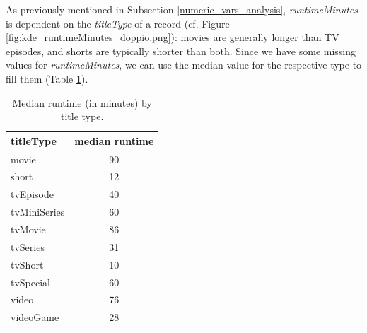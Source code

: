 \begin{table}[h]
    \centering
    \small
    \caption{Top genre for each title type with missing values for \textit{genres}.}
    \label{tab:title_types_top_nan}
\end{table}

As previously mentioned in Subsection \ref{numeric_vars_analysis}, \textit{runtimeMinutes} is dependent on the \textit{titleType} of a record (cf. Figure \ref{fig:kde_runtimeMinutes_doppio.png}): movies are generally longer than TV episodes, and shorts are typically shorter than both. Since we have some missing values for \textit{runtimeMinutes}, we can use the median value for the respective type to fill them (Table \ref{tab:median_runtime}).
\begin{table}[h]
    \centering
    \begin{tabular}{|l|c|}
    \hline
    \textbf{titleType} & \textbf{median runtime} \\ \hline
    movie & 90 \\ \hline
    short & 12 \\ \hline
    tvEpisode & 40 \\ \hline
    tvMiniSeries & 60 \\ \hline
    tvMovie & 86 \\ \hline
    tvSeries & 31 \\ \hline
    tvShort & 10 \\ \hline
    tvSpecial & 60 \\ \hline
    video & 76 \\ \hline
    videoGame & 28 \\ \hline
    \end{tabular}
    \caption{Median runtime (in minutes) by title type.}
    \label{tab:median_runtime}
\end{table}

